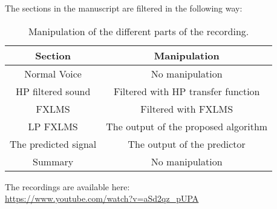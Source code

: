 The sections in the manuscript are filtered in the following way:
\begin{table}[H]
	\centering
	\begin{tabular}{ c c } \toprule
		{Section}				& {Manipulation} \\ \bottomrule 
		Normal Voice			& No manipulation  	\\
		HP filtered sound		& Filtered with HP transfer function \\
		FXLMS					& Filtered with FXLMS	\\
		LP FXLMS 				& The output of the proposed algorithm	\\
		The predicted signal 	& The output of the predictor	\\
		Summary 				& No manipulation	\\
		\bottomrule
	\end{tabular}
	\caption{Manipulation of the different parts of the recording.}
	\label{tab:VoiceRecSections}
\end{table}

The recordings are available here: \\
\url{https://www.youtube.com/watch?v=aSd2qz_pUPA} 













